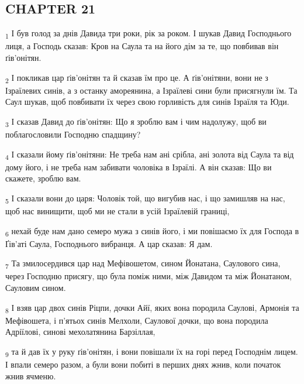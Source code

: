 \subsection{CHAPTER 21}
\begin{tcolorbox}
\textsubscript{1} І був голод за днів Давида три роки, рік за роком. І шукав Давид Господнього лиця, а Господь сказав: Кров на Саула та на його дім за те, що повбивав він ґів'онітян.
\end{tcolorbox}
\begin{tcolorbox}
\textsubscript{2} І покликав цар ґів'онітян та й сказав їм про це. А ґів'онітяни, вони не з Ізраїлевих синів, а з останку амореянина, а Ізраїлеві сини були присягнули їм. Та Саул шукав, щоб повбивати їх через свою горливість для синів Ізраїля та Юди.
\end{tcolorbox}
\begin{tcolorbox}
\textsubscript{3} І сказав Давид до ґів'онітян: Що я зроблю вам і чим надолужу, щоб ви поблагословили Господню спадщину?
\end{tcolorbox}
\begin{tcolorbox}
\textsubscript{4} І сказали йому ґів'онітяни: Не треба нам ані срібла, ані золота від Саула та від дому його, і не треба нам забивати чоловіка в Ізраїлі. А він сказав: Що ви скажете, зроблю вам.
\end{tcolorbox}
\begin{tcolorbox}
\textsubscript{5} І сказали вони до царя: Чоловік той, що вигубив нас, і що замишляв на нас, щоб нас винищити, щоб ми не стали в усій Ізраїлевій границі,
\end{tcolorbox}
\begin{tcolorbox}
\textsubscript{6} нехай буде нам дано семеро мужа з синів його, і ми повішаємо їх для Господа в Ґів'аті Саула, Господнього вибранця. А цар сказав: Я дам.
\end{tcolorbox}
\begin{tcolorbox}
\textsubscript{7} Та змилосердився цар над Мефівошетом, сином Йонатана, Саулового сина, через Господню присягу, що була поміж ними, між Давидом та між Йонатаном, Сауловим сином.
\end{tcolorbox}
\begin{tcolorbox}
\textsubscript{8} І взяв цар двох синів Ріцпи, дочки Айї, яких вона породила Саулові, Армонія та Мефівошета, і п'ятьох синів Мелхоли, Саулової дочки, що вона породила Адріїлові, синові мехолатянина Барзіллая,
\end{tcolorbox}
\begin{tcolorbox}
\textsubscript{9} та й дав їх у руку ґів'онітян, і вони повішали їх на горі перед Господнім лицем. І впали семеро разом, а були вони побиті в перших днях жнив, коли початок жнив ячменю.
\end{tcolorbox}
